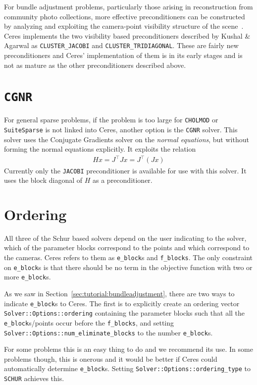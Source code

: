 For bundle adjustment problems, particularly those arising in reconstruction from community photo collections, more effective preconditioners can be constructed by analyzing and exploiting the camera-point visibility structure of the scene~\cite{kushal2012}. Ceres implements the two visibility based preconditioners described by Kushal \& Agarwal as \texttt{CLUSTER\_JACOBI} and \texttt{CLUSTER\_TRIDIAGONAL}. These are fairly new preconditioners and Ceres' implementation of them is in its early stages and is not as mature as the other preconditioners described above.


\section{\texttt{CGNR}}
For general sparse problems, if the problem is too large for \texttt{CHOLMOD} or \texttt{SuiteSparse} is not linked into Ceres, another option is the \texttt{CGNR} solver. This solver uses the Conjugate Gradients solver on the {\em normal equations}, but without forming the normal equations explicitly. It exploits the relation
\begin{align}
	H x = J^\top J x = J^\top(J x)
\end{align}
Currently only the \texttt{JACOBI} preconditioner is available for use with this solver. It uses the block diagonal of $H$ as a preconditioner. 

\section{Ordering}
All three of the Schur based solvers depend on the user indicating to the solver, which of the parameter blocks correspond to the points and which correspond to the cameras. Ceres refers to them as \texttt{e\_block}s and \texttt{f\_blocks}. The only constraint on \texttt{e\_block}s is that there should be no term in the objective function with two or more \texttt{e\_block}s.

As we saw in Section~\ref{sec:tutorial:bundleadjustment}, there are two ways to indicate \texttt{e\_block}s to Ceres. The first is to explicitly create an ordering vector \texttt{Solver::Options::ordering} containing the parameter blocks such that all the \texttt{e\_block}s/points occur before the \texttt{f\_blocks}, and setting \texttt{Solver::Options::num\_eliminate\_blocks} to the number \texttt{e\_block}s.

For some problems this is an easy thing to do and we recommend its use. In some problems though, this is onerous and it would be better if Ceres could automatically determine \texttt{e\_block}s. Setting \texttt{Solver::Options::ordering\_type} to \texttt{SCHUR} achieves this.

